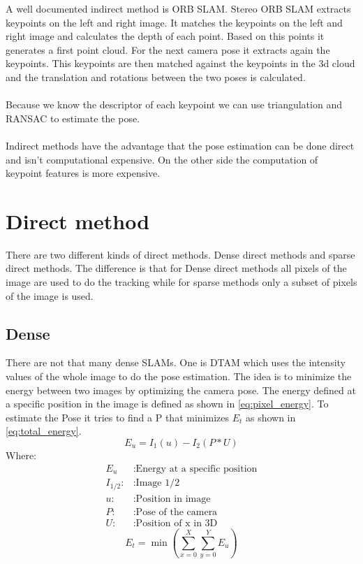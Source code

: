 \documentclass[11pt,a4paper,titlepage,oneside]{report}
\begin{document}
A well documented indirect method is ORB SLAM. Stereo ORB SLAM extracts keypoints on the left and right image. It matches the keypoints on the left and right image and calculates the depth of each point. Based on this points it generates a first point cloud. For the next camera pose it extracts again the keypoints. This keypoints are then matched against the keypoints in the 3d cloud and the translation and rotations between the two poses is calculated.\\\\
Because we know the descriptor of each keypoint we can use triangulation and RANSAC to estimate the pose.\\\\
Indirect methods have the advantage that the pose estimation can be done direct and isn't computational expensive. On the other side the computation of keypoint features is more expensive.

\section{Direct method}

There are two different kinds of direct methods. Dense direct methods and sparse direct methods. The difference is that for Dense direct methods all pixels of the image are used to do the tracking while for sparse methods only a subset of pixels of the image is used.

\subsection{Dense}

There are not that many dense SLAMs. One is DTAM which uses the intensity values of the whole image to do the pose estimation. The idea is to minimize the energy between two images by optimizing the camera pose. The energy defined at a specific position in the image is defined as shown in \ref{eq:pixel_energy}. To estimate the Pose it tries to find a P that minimizes $E_{t}$ as shown in \ref{eq:total_energy}.
\begin{equation}\label{eq:pixel_energy}
  E_{u}=I_1(u)-I_2(P*U)
\end{equation}
Where:
\begin{align*}
  E_{u}		&: \text{Energy at a specific position}\\
  I_{1/2}:	&: \text{Image 1/2}\\
  u:		&: \text{Position in image} \\
  P:		&: \text{Pose of the camera} \\
  U:		&: \text{Position of x in 3D}
\end{align*}
\begin{equation}\label{eq:total_energy}
  E_{t}=\min(\sum_{x=0}^X\sum_{y=0}^YE_u)
\end{equation}
\end{document}
